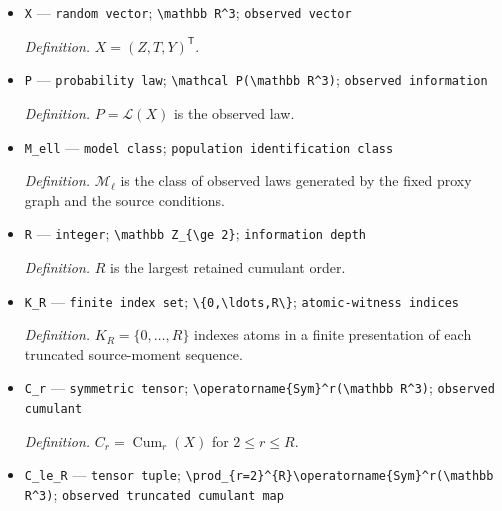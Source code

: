 \documentclass{article}
\begin{document}
\begin{itemize}
  \par\smallskip\noindent\emph{Definition.} \(Y\) is the observed outcome.
  \item \texttt{X} --- \texttt{random vector}; \texttt{\textbackslash{}\allowbreak{}mathbb R\textasciicircum{}3}; \texttt{observed vector}
  \par\smallskip\noindent\emph{Definition.} \(X=(Z,T,Y)^{\mathsf T}\).
  \item \texttt{P} --- \texttt{probability law}; \texttt{\textbackslash{}\allowbreak{}mathcal P(\textbackslash{}\allowbreak{}mathbb R\textasciicircum{}3)}; \texttt{observed information}
  \par\smallskip\noindent\emph{Definition.} \(P=\mathcal L(X)\) is the observed law.
  \item \texttt{M\_\allowbreak{}ell} --- \texttt{model class}; \texttt{population identification class}
  \par\smallskip\noindent\emph{Definition.} \(\mathcal M_{\ell}\) is the class of observed laws generated by the fixed proxy graph and the source conditions.
  \item \texttt{R} --- \texttt{integer}; \texttt{\textbackslash{}\allowbreak{}mathbb Z\_\allowbreak{}\{\textbackslash{}\allowbreak{}ge 2\}\allowbreak{}}; \texttt{information depth}
  \par\smallskip\noindent\emph{Definition.} \(R\) is the largest retained cumulant order.
  \item \texttt{K\_\allowbreak{}R} --- \texttt{finite index set}; \texttt{\textbackslash{}\allowbreak{}\{0,\allowbreak{}\textbackslash{}\allowbreak{}ldots,\allowbreak{}R\textbackslash{}\allowbreak{}\}\allowbreak{}}; \texttt{atomic-\allowbreak{}witness indices}
  \par\smallskip\noindent\emph{Definition.} \(K_R=\{0,\ldots,R\}\) indexes atoms in a finite presentation of each truncated source-moment sequence.
  \item \texttt{C\_\allowbreak{}r} --- \texttt{symmetric tensor}; \texttt{\textbackslash{}\allowbreak{}operatorname\{Sym\}\allowbreak{}\textasciicircum{}r(\textbackslash{}\allowbreak{}mathbb R\textasciicircum{}3)}; \texttt{observed cumulant}
  \par\smallskip\noindent\emph{Definition.} \(C_r=\operatorname{Cum}_r(X)\) for \(2\le r\le R\).
  \item \texttt{C\_\allowbreak{}le\_\allowbreak{}R} --- \texttt{tensor tuple}; \texttt{\textbackslash{}\allowbreak{}prod\_\allowbreak{}\{r=\allowbreak{}2\}\allowbreak{}\textasciicircum{}\{R\}\allowbreak{}\textbackslash{}\allowbreak{}operatorname\{Sym\}\allowbreak{}\textasciicircum{}r(\textbackslash{}\allowbreak{}mathbb R\textasciicircum{}3)}; \texttt{observed truncated cumulant map}

\end{itemize}
\end{document}
